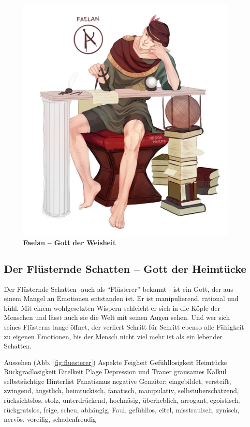 \begin{figure}[tbh]
	\centering
	\includegraphics[height=0.45\textheight]{Abbildungen/Gesellschaft/Religion/faelan}
	\caption[Faelan -- Gott der Weisheit]{\textbf{Faelan -- Gott der Weisheit}}
	\label{fig:faelan}
\end{figure}




\subsection{Der Flüsternde Schatten -- Gott der Heimtücke}
Der Flüsternde Schatten -auch als ``Flüsterer'' bekannt - ist ein Gott, der aus einem Mangel an Emotionen entstanden ist.
Er ist manipulierend, rational und kühl. 
Mit einem wohlgesetzten Wispern schleicht er sich in die Köpfe der Menschen und lässt auch sie die Welt mit seinen Augen sehen. 
Und wer sich seines Flüsterns lange öffnet, der verliert Schritt für Schritt ebenso alle Fähigkeit zu eigenen Emotionen, bis der Mensch nicht viel mehr ist als ein lebender Schatten.
\begin{outline}
	\1 Aussehen (Abb. \ref{fig:fluesterer})
	\1 Aspekte
		\2 Feigheit
		\2 Gefühllosigkeit
		\2 Heimtücke
		\2 Rückgradlosigkeit
		\2 Eitelkeit
	\1 Plage
		\2 Depression und Trauer
		\2 grausames Kalkül
		\2 selbstsüchtige Hinterlist
		\2 Fanatismus
	\1 negative Gemüter: eingebildet, versteift, zwingend, ängstlich, heimtückisch, fanatisch, manipulativ, selbstüberschätzend, rücksichtslos, stolz, unterdrückend, hochnäsig,
	überheblich, arrogant, egoistisch, rückgratslos, feige, scheu, abhängig, Faul, gefühllos, eitel, misstrauisch, zynisch, nervös, voreilig, schadenfreudig
\end{outline}

